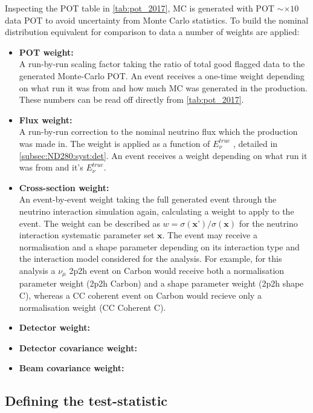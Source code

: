 Inspecting the POT table in \autoref{tab:pot_2017}, MC is generated with POT $\sim\times10$ data POT to avoid uncertainty from Monte Carlo statistics. To build the nominal distribution equivalent for comparison to data a number of weights are applied:
\begin{itemize}
	\item \textbf{POT weight:} \\
	A run-by-run scaling factor taking the ratio of total good flagged data to the generated Monte-Carlo POT. An event receives a one-time weight depending on what run it was from and how much MC was generated in the production. These numbers can be read off directly from \autoref{tab:pot_2017}. \\ 
	\item \textbf{Flux weight:} \\
	A run-by-run correction to the nominal neutrino flux which the production was made in. The weight is applied as a function of $E_\nu^{true}$ , detailed in \autoref{subsec:ND280:syst:det}. An event receives a weight depending on what run it was from and it's $E_\nu^{true}$. \\
	\item \textbf{Cross-section weight:} \\
	An event-by-event weight taking the full generated event through the neutrino interaction simulation again, calculating a weight to apply to the event. The weight can be described as $w=\sigma(\textbf{x'})/\sigma(\textbf{x})$ for the neutrino interaction systematic parameter set $\textbf{x}$. The event may receive a normalisation and a shape parameter depending on its interaction type and the interaction model considered for the analysis. For example, for this analysis a $\nu_\mu$ 2p2h event on Carbon would receive both a normalisation parameter weight (2p2h Carbon) and a shape parameter weight (2p2h shape C), whereas a CC coherent event on Carbon would recieve only a normalisation weight (CC Coherent C). \\
	\item \textbf{Detector weight:} \\
	\item \textbf{Detector covariance weight:} \\
	\item \textbf{Beam covariance weight:} \\
\end{itemize}

\subsection{Defining the test-statistic}


